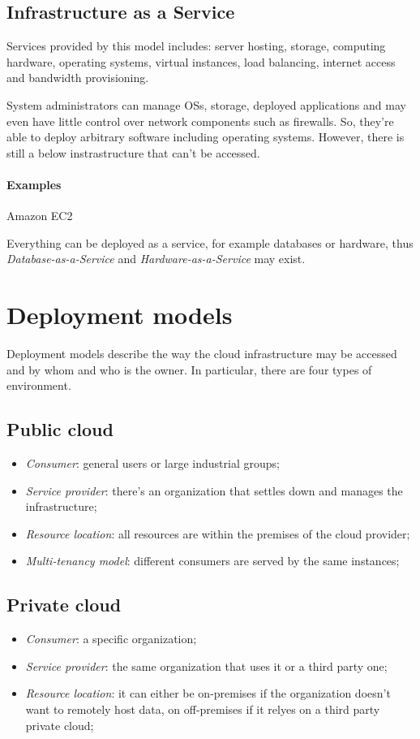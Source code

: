 \subsection{Infrastructure as a Service}
Services provided by this model includes: server hosting, storage, computing
hardware, operating systems, virtual instances, load balancing, internet access
and bandwidth provisioning.

System administrators can manage OSs, storage, deployed applications and may
even have little control over network components such as firewalls. So, they're
able to deploy arbitrary software including operating systems. However, there
is still a below instrastructure that can't be accessed.

\paragraph{Examples} Amazon EC2

\begin{note}
    Everything can be deployed as a service, for example databases or hardware,
    thus \emph{Database-as-a-Service} and \emph{Hardware-as-a-Service} may
    exist.
\end{note}

\section{Deployment models}
Deployment models describe the way the cloud infrastructure may be accessed
and by whom and who is the owner. In particular, there are four types of
environment.

\subsection{Public cloud}
\begin{itemize}
    \item \emph{Consumer}: general users or large industrial groups;
    \item \emph{Service provider}: there's an organization that settles down
    and manages the infrastructure;
    \item \emph{Resource location}: all resources are within the premises of the
    cloud provider;
    \item \emph{Multi-tenancy model}: different consumers are served by the same
    instances;
\end{itemize}

\subsection{Private cloud}
\begin{itemize}
    \item \emph{Consumer}: a specific organization;
    \item \emph{Service provider}: the same organization that uses it or a third
    party one;
    \item \emph{Resource location}: it can either be on-premises if the organization
    doesn't want to remotely host data, on off-premises if it relyes on a third
    party private cloud;
\end{itemize}

